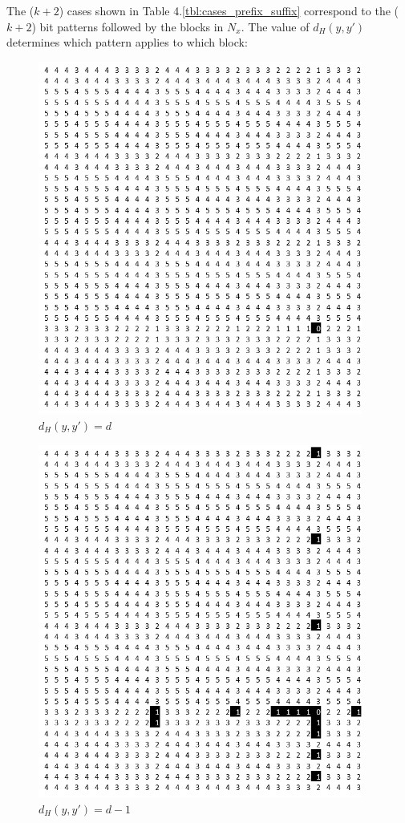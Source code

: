 \documentclass[oneside,12pt]{DISCSthesis}
\begin{document}
		\newpage
		\noindent The ($k+2$) cases shown in Table 4.\ref{tbl:cases_prefix_suffix} correspond to the ($k+2$) bit patterns followed by the blocks in $N_x$. The value of $d_H(y,y')$ determines which pattern applies to which block:

		\begin{figure}[h]\label{fig:cases_block_patterns}
			\footnotesize
			\begin{minipage}{.33\textwidth}\centering\includegraphics[width=0.95\textwidth]{img/0}\\ $d_H(y,y') = d$ \end{minipage} 
			\begin{minipage}{.33\textwidth}\centering\includegraphics[width=0.95\textwidth]{img/1}\\ $d_H(y,y') = d-1$ \end{minipage}

\end{figure}
\end{document}
